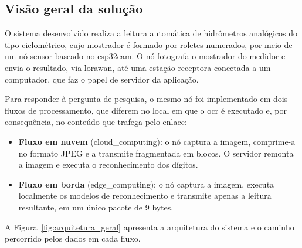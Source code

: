\subsection{Visão geral da solução}
\label{subsec:visao_geral}

O sistema desenvolvido realiza a leitura automática de hidrômetros analógicos do tipo
ciclométrico, cujo mostrador é formado por roletes numerados, por meio de um nó sensor
baseado no \gls{esp32cam}. O nó fotografa o mostrador do medidor e envia o resultado,
via \gls{lorawan}, até uma estação receptora conectada a um computador, que faz o papel
de servidor da aplicação.

Para responder à pergunta de pesquisa, o mesmo nó foi implementado em dois fluxos de
processamento, que diferem no local em que o \gls{ocr} é executado e, por consequência,
no conteúdo que trafega pelo enlace:

\begin{itemize}
    \item \textbf{Fluxo em nuvem} (\gls{cloud_computing}): o nó captura a imagem, comprime-a
    no formato JPEG e a transmite fragmentada em blocos. O servidor remonta a imagem e
    executa o reconhecimento dos dígitos.
    \item \textbf{Fluxo em borda} (\gls{edge_computing}): o nó captura a imagem, executa
    localmente os modelos de reconhecimento e transmite apenas a leitura resultante, em um
    único pacote de 9 bytes.
\end{itemize}

A Figura~\ref{fig:arquitetura_geral} apresenta a arquitetura do sistema e o caminho
percorrido pelos dados em cada fluxo.

